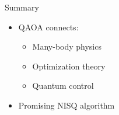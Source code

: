 \documentclass{beamer}
\begin{document}

\begin{frame}{Summary}
\begin{itemize}
\item QAOA connects:
\begin{itemize}
\item Many-body physics
\item Optimization theory
\item Quantum control
\end{itemize}
\item Promising NISQ algorithm
\end{itemize}
\end{frame}
\end{document}
